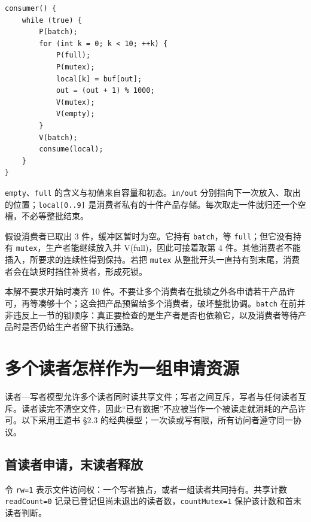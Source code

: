 \par\medskip\noindent
\begin{minipage}{\linewidth}
\begin{verbatim}
consumer() {
    while (true) {
        P(batch);
        for (int k = 0; k < 10; ++k) {
            P(full);
            P(mutex);
            local[k] = buf[out];
            out = (out + 1) % 1000;
            V(mutex);
            V(empty);
        }
        V(batch);
        consume(local);
    }
}
\end{verbatim}
\end{minipage}\par\medskip

\allowbreak{}\texttt{empty}、\allowbreak{}\texttt{full} 的含义与初值来自容量和初态。\allowbreak{}\texttt{in/out} 分别指向下一次放入、取出的位置；\allowbreak{}\texttt{local{[}0..9{]}} 是消费者私有的十件产品存储。每次取走一件就归还一个空槽，不必等整批结束。

假设消费者已取出 3 件，缓冲区暂时为空。它持有 \allowbreak{}\texttt{batch}，等 \allowbreak{}\texttt{full}；但它没有持有 \allowbreak{}\texttt{mutex}，生产者能继续放入并 V(full)，因此可接着取第 4 件。其他消费者不能插入，所要求的连续性得到保持。若把 \allowbreak{}\texttt{mutex} 从整批开头一直持有到末尾，消费者会在缺货时挡住补货者，形成死锁。

本解不要求开始时凑齐 10 件。不要让多个消费者在批锁之外各申请若干产品许可，再等凑够十个；这会把产品预留给多个消费者，破坏整批协调。\allowbreak{}\texttt{batch} 在前并非违反上一节的锁顺序：真正要检查的是生产者是否也依赖它，以及消费者等待产品时是否仍给生产者留下执行通路。

\section{多个读者怎样作为一组申请资源}\label{sec-readers}

读者---写者模型允许多个读者同时读共享文件；写者之间互斥，写者与任何读者互斥。读者读完不清空文件，因此``已有数据''不应被当作一个被读走就消耗的产品许可。以下采用王道书 §2.3 的经典模型；一次读或写有限，所有访问者遵守同一协议。

\subsection{首读者申请，末读者释放}\label{os-c03-h375}

令 \allowbreak{}\texttt{rw=1} 表示文件访问权：一个写者独占，或者一组读者共同持有。共享计数 \allowbreak{}\texttt{readCount=0} 记录已登记但尚未退出的读者数，\allowbreak{}\texttt{countMutex=1} 保护该计数和首末读者判断。

